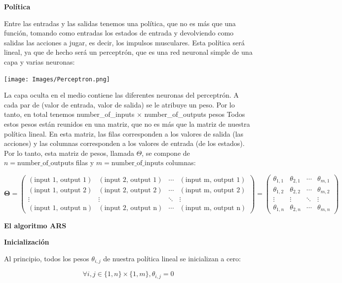 \documentclass[
]{book}
\begin{document}
\textbf{Política}

Entre las entradas y las salidas tenemos una política, que no es más que una función, tomando como entradas los estados de entrada y devolviendo como salidas las acciones a jugar, es decir, los impulsos musculares. Esta política será lineal, ya que de hecho será un perceptrón, que es una red neuronal simple de una capa y varias neuronas:

\texttt{[image: Images/Perceptron.png]}

La capa oculta en el medio contiene las diferentes neuronas del perceptrón. A cada par de (valor de entrada, valor de salida) se le atribuye un peso. Por lo tanto, en total tenemos number\_of\_inputs \(\times\) number\_of\_outputs pesos Todos estos pesos están reunidos en una matriz, que no es más que la matriz de nuestra política lineal. En esta matriz, las filas corresponden a los valores de salida (las acciones) y las columnas corresponden a los valores de entrada (de los estados). Por lo tanto, esta matriz de pesos, llamada \(\Theta\), se compone de \(n = \textrm{number\_of\_outputs}\) filas y \(m = \textrm{number\_of\_inputs}\) columnas:

\[
\boldsymbol{\Theta}
=
\begin{pmatrix}
(\textrm{input 1, output 1}) & (\textrm{input 2, output 1}) & \cdots & (\textrm{input m, output 1}) \\
(\textrm{input 1, output 2}) & (\textrm{input 2, output 2}) & \cdots & (\textrm{input m, output 2}) \\
\vdots & \vdots & \ddots & \vdots \\
(\textrm{input 1, output n}) & (\textrm{input 2, output n}) & \cdots & (\textrm{input m, output n})
\end{pmatrix}
=
\begin{pmatrix}
\theta_{1,1} & \theta_{2,1} & \cdots & \theta_{m,1} \\
\theta_{1,2} & \theta_{2,2} & \cdots & \theta_{m,2} \\
\vdots & \vdots & \ddots & \vdots \\
\theta_{1,n} & \theta_{2,n} & \cdots & \theta_{m,n}
\end{pmatrix}
\]

\textbf{El algoritmo ARS}

\textbf{Inicialización}

Al principio, todos los pesos \(\theta_{i, j}\) de nuestra política lineal se inicializan a cero:

\[\forall i,j \in \{1,n\}\times\{1,m\}, \theta_{i,j} = 0\]
\end{document}
